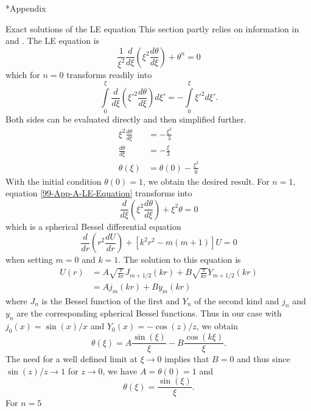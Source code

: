 \begin{appendix}
\renewcommand{\thesection}{\Alph{section}}
\renewcommand{\thesubsection}{\Alph{subsection}}

\begin{section}*{Appendix}
%
%
\begin{subsection}{Exact solutions of the LE equation}
\label{99-App-A-Exact-LE-Solutions}
This section partly relies on information in \cite{weissteinLaneEmdenDifferentialEquation} and \cite{chandrasekharChandrasekharAnIntroductionStudy1958}. The LE equation is
\begin{equation}
	\frac{1}{\xi^2}\frac{d}{d\xi}\left(\xi^2\frac{d\theta}{d\xi}\right)+\theta^n=0
	\label{99-App-A-LE-Equation}
\end{equation}
which for $n=0$ transforms readily into
\begin{equation}
	\int\limits_0^\xi\frac{d}{d\xi}\left(\xi'^2\frac{d\theta}{d\xi}\right)d\xi' = -\int\limits_0^\xi\xi'^2d\xi'.
\end{equation}
Both sides can be evaluated directly and then simplified further.
\begin{align}
	\xi^2\frac{d\theta}{d\xi} &= -\frac{\xi^3}{3}\\
	\frac{d\theta}{d\xi} &= -\frac{\xi}{3}\\
	\theta(\xi) &= \theta(0)-\frac{\xi^2}{6}
\end{align}
With the initial condition $\theta(0)=1$, we obtain the desired result. For $n=1$, equation \ref{99-App-A-LE-Equation} transforms into
\begin{equation}
	\frac{d}{d\xi}\left(\xi^2\frac{d\theta}{d\xi}\right)+\xi^2\theta=0
\end{equation}
which is a spherical Bessel differential equation
\begin{equation}
	\frac{d}{dr}\left(r^2\frac{dU}{dr}\right)+\left[k^2r^2-m(m+1)\right]U=0
\end{equation}
when setting $m=0$ and $k=1$. The solution to this equation is \cite{weissteinSphericalBesselDifferential}
\begin{align}
	U(r) 	&= A\sqrt{\frac{\pi}{kr}}J_{m+1/2}(kr) + B\sqrt{\frac{\pi}{kr}}Y_{m+1/2}(kr)\\
			&= Aj_m(kr) + By_m(kr)
\end{align}
where $J_n$ is the Bessel function of the first and $Y_n$ of the second kind and $j_n$ and $y_n$ are the corresponding spherical Bessel functions. Thus in our case with $j_{0}(x)=\sin(x)/x$ and $Y_{0}(x)=-\cos(z)/z$, we obtain
\begin{equation}
	\theta(\xi) = A\frac{\sin(\xi)}{\xi} - B\frac{\cos(k\xi)}{\xi}.
\end{equation}
The need for a well defined limit at $\xi\rightarrow0$ implies that $B=0$ and thus since $\sin(z)/z\rightarrow1$ for $z\rightarrow0$, we have $A=\theta(0)=1$ and 
\begin{equation}
	\theta(\xi) = \frac{\sin(\xi)}{\xi}.
\end{equation}
For $n=5$






\end{subsection}
\end{section}
\end{appendix}
